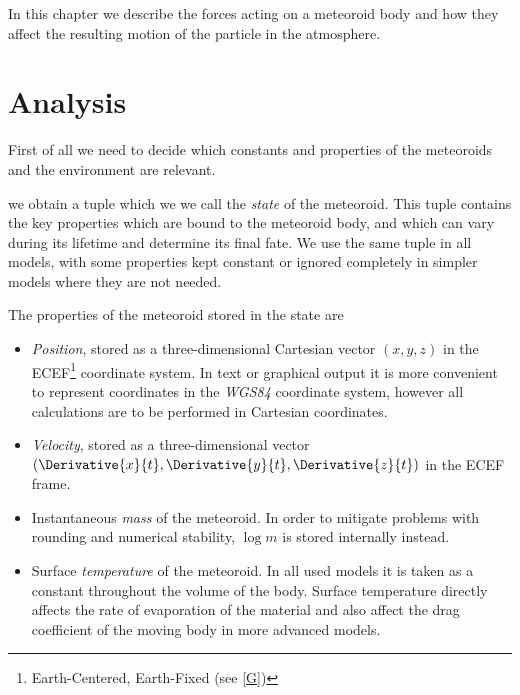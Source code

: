 
In this chapter we describe the forces acting on a meteoroid body
and how they affect the resulting motion of the particle in the atmosphere.

\section{Analysis} \label{da}
    First of all we need to decide which constants and properties of the meteoroids
    and the environment are relevant.

    we obtain a tuple which we we call the \emph{state} of the meteoroid.
    This tuple contains the key properties which are bound to the meteoroid body,
    and which can vary during its lifetime and determine its final fate.
    We use the same tuple in all models, with some properties
    kept constant or ignored completely in simpler models where they are not needed.

    The properties of the meteoroid stored in the state are
    \begin{itemize}
        \item \emph{Position}, stored as a three-dimensional Cartesian vector $(x, y, z)$
            in the ECEF\footnote{Earth-Centered, Earth-Fixed (see \cref{G})} coordinate system.
            In text or graphical output it is more convenient to represent
            coordinates in the \emph{WGS84} coordinate system, however
            all calculations are to be performed in Cartesian coordinates.
        \item \emph{Velocity}, stored as a three-dimensional vector
            $(\Derivative{x}{t}, \Derivative{y}{t}, \Derivative{z}{t})$
            in the ECEF frame.
        \item Instantaneous \emph{mass} of the meteoroid. In order to mitigate
            problems with rounding and numerical stability, $\log m$ is stored internally instead.
        \item Surface \emph{temperature} of the meteoroid. In all used models
            it is taken as a constant throughout the volume of the body.
            Surface temperature directly affects the rate of evaporation of the material
            and also affect the drag coefficient of the moving body in more advanced models.
    \end{itemize}

